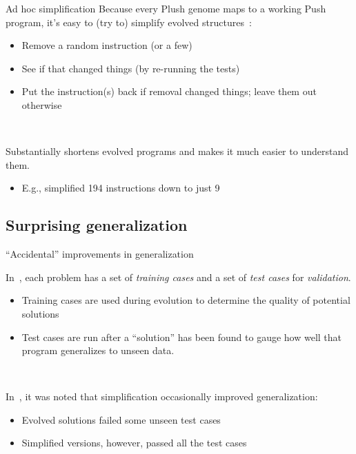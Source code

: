 \documentclass{beamer}
\begin{document}
\begin{frame}{Ad hoc simplification}
Because every Plush genome maps to a working Push program, it's easy to (try to) simplify evolved structures~\cite{Spector:2014:GECCOcomp}:
\begin{itemize}
	\item Remove a random instruction (or a few)
	\item See if that changed things (by re-running the tests)
	\item Put the instruction(s) back if removal changed things; leave them out otherwise
\end{itemize}
 
 ~
 
 Substantially shortens evolved programs and makes it much easier to
 understand them.
 \begin{itemize}
 	\item E.g., simplified 194 instructions down to just 9
 \end{itemize}
\end{frame}

\subsection{Surprising generalization}

\begin{frame}{``Accidental'' improvements in generalization}

In~\cite{Helmuth:2015:GECCO}, each problem has a set of \emph{training cases} and a set of \emph{test cases} for \emph{validation}.
\begin{itemize}
	\item Training cases are used during evolution to determine the quality of potential solutions
	\item Test cases are run after a ``solution'' has been found to gauge how well that program generalizes to unseen data.
\end{itemize}

~

In~\cite{Helmuth:2015:dissertation}, it was noted that simplification occasionally improved generalization:
\begin{itemize}
	\item Evolved solutions failed some unseen test cases
	\item Simplified versions, however, passed all the test cases
\end{itemize}

\end{frame}
\end{document}
